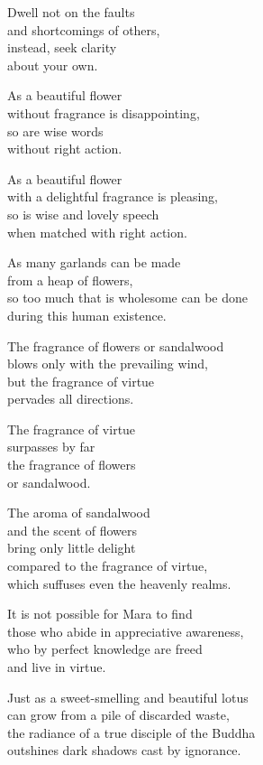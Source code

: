 Dwell not on the faults\\
and shortcomings of others,\\
instead, seek clarity\\
about your own.


As a beautiful flower\\
without fragrance is disappointing,\\
so are wise words\\
without right action.



As a beautiful flower\\
with a delightful fragrance is pleasing,\\
so is wise and lovely speech\\
when matched with right action.


As many garlands can be made\\
from a heap of flowers,\\
so too much that is wholesome can be done\\
during this human existence.


The fragrance of flowers or sandalwood\\
blows only with the prevailing wind,\\
but the fragrance of virtue\\
pervades all directions.


The fragrance of virtue\\
surpasses by far\\
the fragrance of flowers\\
or sandalwood.


The aroma of sandalwood\\
and the scent of flowers\\
bring only little delight\\
compared to the fragrance of virtue,\\
which suffuses even the heavenly realms.


It is not possible for Mara to find\\
those who abide in appreciative awareness,\\
who by perfect knowledge are freed\\
and live in virtue.

Just as a sweet-smelling and beautiful lotus\\
can grow from a pile of discarded waste,\\
the radiance of a true disciple of the Buddha\\
outshines dark shadows cast by ignorance.

